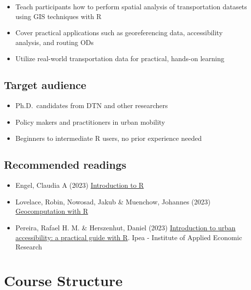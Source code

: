 \documentclass[
  letterpaper,
  DIV=11,
  numbers=noendperiod]{scrreprt}
\providecommand{\tightlist}{%
  \setlength{\itemsep}{0pt}\setlength{\parskip}{0pt}}\usepackage{longtable,booktabs,array}
\begin{document}
\begin{itemize}
\item
  Teach participants how to perform spatial analysis of transportation
  datasets using GIS techniques with R
\item
  Cover practical applications such as georeferencing data,
  accessibility analysis, and routing ODs
\item
  Utilize real-world transportation data for practical, hands-on
  learning
\end{itemize}

\section{Target audience}\label{target-audience}

\begin{itemize}
\item
  Ph.D.~candidates from DTN and other researchers
\item
  Policy makers and practitioners in urban mobility
\item
  Beginners to intermediate R users, no prior experience needed
\end{itemize}

\section{Recommended readings}\label{recommended-readings}

\begin{itemize}
\tightlist
\item
  Engel, Claudia A (2023)
  \href{https://cengel.github.io/R-intro/}{Introduction to R}
\item
  Lovelace, Robin, Nowosad, Jakub \& Muenchow, Johannes (2023)
  \href{https://geocompr.robinlovelace.net/}{Geocomputation with R}
\item
  Pereira, Rafael H. M. \& Herszenhut, Daniel (2023)
  \href{https://ipeagit.github.io/intro_access_book/index.en.html}{Introduction
  to urban accessibility: a practical guide with R}. Ipea - Institute of
  Applied Economic Research
\end{itemize}


\chapter{Course Structure}\label{course-structure}
\end{document}
